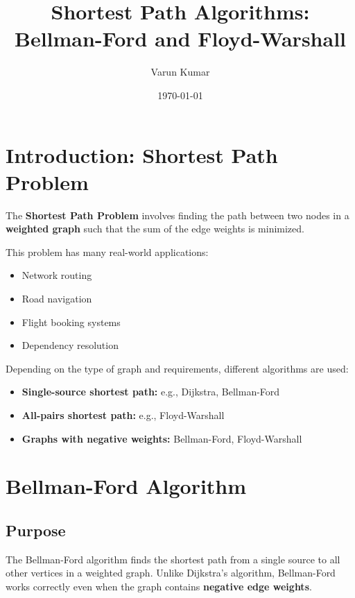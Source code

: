 \documentclass[14pt,a4paper]{extarticle}
\title{Shortest Path Algorithms: Bellman-Ford and Floyd-Warshall}
\author{Varun Kumar}
\date{\today}
\begin{document}
\maketitle
\tableofcontents
\listofalgorithms
\lstlistoflistings
\listoftables
\newpage

\section{Introduction: Shortest Path Problem}
The \textbf{Shortest Path Problem} involves finding the path between two nodes in a \textbf{weighted graph} such that the sum of the edge weights is minimized.

This problem has many real-world applications:
\begin{itemize}[leftmargin=1.5em]
  \item Network routing
  \item Road navigation
  \item Flight booking systems
  \item Dependency resolution
\end{itemize}

Depending on the type of graph and requirements, different algorithms are used:
\begin{itemize}[leftmargin=1.5em]
  \item \textbf{Single-source shortest path:} e.g., Dijkstra, Bellman-Ford
  \item \textbf{All-pairs shortest path:} e.g., Floyd-Warshall
  \item \textbf{Graphs with negative weights:} Bellman-Ford, Floyd-Warshall
\end{itemize}

\newpage
\section{Bellman-Ford Algorithm}
\subsection{Purpose}
The Bellman-Ford algorithm finds the shortest path from a single source to all other vertices in a weighted graph. Unlike Dijkstra’s algorithm, Bellman-Ford works correctly even when the graph contains \textbf{negative edge weights}.
\end{document}
